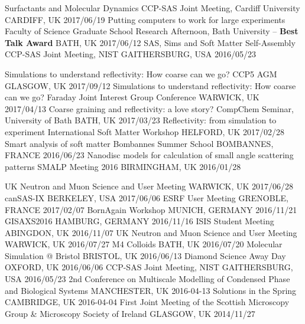 \begin{cvhonors}
  \cvhonor
    {Surfactants and Molecular Dynamics}
    {CCP-SAS Joint Meeting, Cardiff University}
    {CARDIFF, UK}
    {2017/06/19}
  \cvhonor
  	{Putting computers to work for large experiments}
    {Faculty of Science Graduate School Research Afternoon, Bath University -- \textbf{Best Talk Award}}
    {BATH, UK}
    {2017/06/12}
  \cvhonor
    {SAS, Sims and Soft Matter Self-Assembly}
    {CCP-SAS Joint Meeting, NIST}
    {GAITHERSBURG, USA}
    {2016/05/23}
\end{cvhonors}

\begin{cvhonors}
  \cvhonor
    {Simulations to understand reflectivity: How coarse can we go?}
    {CCP5 AGM}
    {GLASGOW, UK}
    {2017/09/12}
  \cvhonor
  	{Simulations to understand reflectivity: How coarse can we go?}
    {Faraday Joint Interest Group Conference}
    {WARWICK, UK}
    {2017/04/13}
  \cvhonor
  	{Coarse graining and reflectivity: a love story?}
    {CompChem Seminar, University of Bath}
    {BATH, UK}
    {2017/03/23}
  \cvhonor
  	{Reflectivity: from simulation to experiment}
    {International Soft Matter Workshop}
    {HELFORD, UK}
    {2017/02/28}
  \cvhonor
    {Smart analysis of soft matter}
    {Bombannes Summer School}
    {BOMBANNES, FRANCE}
    {2016/06/23}
  \cvhonor
    {Nanodisc models for calculation of small angle scattering patterns}
    {SMALP Meeting 2016}
    {BIRMINGHAM, UK}
    {2016/01/28}
\end{cvhonors}

\begin{cvhonors}
  \cvhonornb
    {UK Neutron and Muon Science and User Meeting}
    {WARWICK, UK}
    {2017/06/28}
  \cvhonornb
    {canSAS-IX}
    {BERKELEY, USA}
    {2017/06/06}
  \cvhonornb
    {ESRF User Meeting}
    {GRENOBLE, FRANCE}
    {2017/02/07}
  \cvhonornb
    {BornAgain Workshop}
    {MUNICH, GERMANY}
    {2016/11/21}
  \cvhonornb
    {GISAXS2016}
    {HAMBURG, GERMANY}
    {2016/11/16}
  \cvhonornb
    {ISIS Student Meeting}
    {ABINGDON, UK}
    {2016/11/07}
  \cvhonornb
    {UK Neutron and Muon Science and User Meeting}
    {WARWICK, UK}
    {2016/07/27}
  \cvhonornb
    {M4 Colloids}
    {BATH, UK}
    {2016/07/20}
  \cvhonornb
    {Molecular Simulation @ Bristol}
    {BRISTOL, UK}
    {2016/06/13}
  \cvhonornb
    {Diamond Science Away Day}
    {OXFORD, UK}
    {2016/06/06}
  \cvhonornb
    {CCP-SAS Joint Meeting, NIST}
    {GAITHERSBURG, USA}
    {2016/05/23}
  \cvhonornb
    {2nd Conference on Multiscale Modelling of Condensed Phase and Biological Systems}
    {MANCHESTER, UK}
    {2016-04-13}
  \cvhonornb
    {Solutions in the Spring}
    {CAMBRIDGE, UK}
    {2016-04-04}
  \cvhonornb
    {First Joint Meeting of the Scottish Microscopy Group \& Microscopy Society of Ireland}
    {GLASGOW, UK}
    {2014/11/27}
\end{cvhonors}

